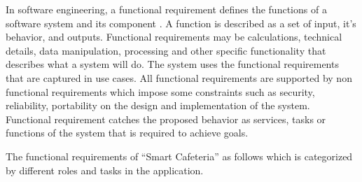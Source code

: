 In software engineering, a functional requirement defines the functions of a
software system and its component \cite{Karthika2012}. A function is described
as a set of input, it's behavior, and outputs. Functional requirements may be
calculations, technical details, data manipulation, processing and other
specific functionality that describes what a system will do. The system uses the
functional requirements that are captured in use cases. All functional
requirements are supported by non functional requirements which impose some
constraints  such as security, reliability, portability on the design and
implementation of the system. Functional requirement catches the proposed
behavior as services, tasks or functions of the system that is required to
achieve goals.

The functional requirements of ``Smart Cafeteria'' as follows which is
categorized by different roles and tasks in the application.
